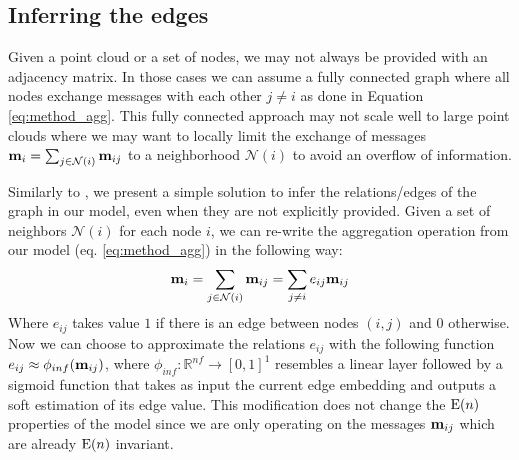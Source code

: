 \subsection{Inferring the edges} \label{sec:edges_inference}
Given a point cloud or a set of nodes, we may not always be provided with an adjacency matrix. In those cases we can assume a fully connected graph where all nodes exchange messages with each other $j \neq i$ as done in Equation \ref{eq:method_agg}. This fully connected approach may not scale well to large point clouds where we may want to locally limit the exchange  of messages $\mathbf{m}_i = 
   \sum_{j \in \mathcal{N}(i)}\mathbf{m}_{ij}$ to a neighborhood $\mathcal{N}(i)$ to avoid an overflow of information.

Similarly to \cite{serviansky2020set2graph, kipf2018neural}, we present a simple solution to infer the relations/edges of the graph in our model, even when they are not explicitly provided. Given a set of neighbors $\mathcal{N}(i)$ for each node $i$, we can re-write the aggregation operation from our model (eq. \ref{eq:method_agg}) in the following way:
\begin{equation}\label{eq:attention}
   \mathbf{m}_i = 
   \sum_{j \in \mathcal{N}(i)}\mathbf{m}_{ij} = \sum_{j \neq i} e_{ij}\mathbf{m}_{ij} 
\end{equation}
Where $e_{ij}$ takes value $1$ if there is an edge between nodes $(i,j)$ and $0$ otherwise. %
Now we can choose to approximate the relations $e_{ij}$ with the following function $e_{ij} \approx \phi_{inf}(\mathbf{m}_{ij})$, where $\phi_{inf}: \mathbb{R}^{nf} \rightarrow [0, 1]^1$ resembles a linear layer followed by a sigmoid function that takes as input the current edge embedding and outputs a soft estimation of its edge value. This modification does not change the $\mathrm{E}(n)$ properties of the model since we are only operating on the messages $\mathbf{m}_{ij}$ which are already $\mathrm{E}(n)$ invariant. 
